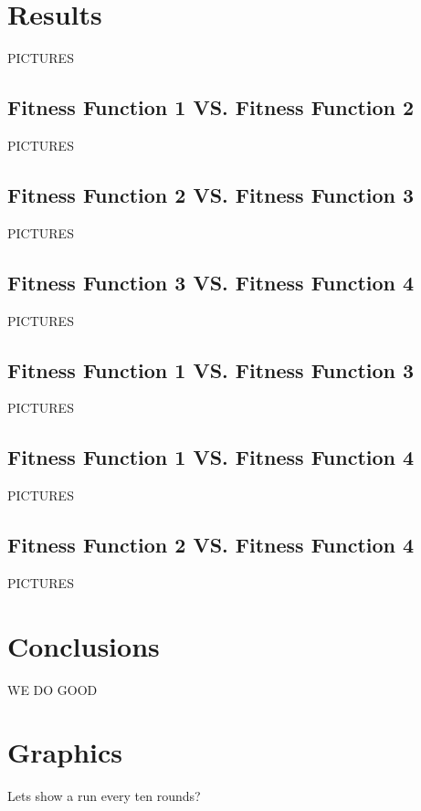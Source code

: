 \documentclass{acm_proc_article-sp}
\begin{document}
\section{Results} %

PICTURES

\subsection{Fitness Function 1 VS. Fitness Function 2}

PICTURES

\subsection{Fitness Function 2 VS. Fitness Function 3}

PICTURES

\subsection{Fitness Function 3 VS. Fitness Function 4}

PICTURES

\subsection{Fitness Function 1 VS. Fitness Function 3}

PICTURES

\subsection{Fitness Function 1 VS. Fitness Function 4}

PICTURES

\subsection{Fitness Function 2 VS. Fitness Function 4}

PICTURES

\section{Conclusions} %

WE DO GOOD

%

%
%



\appendix
\section{Graphics}

Lets show a run every ten rounds?

\end{document}
